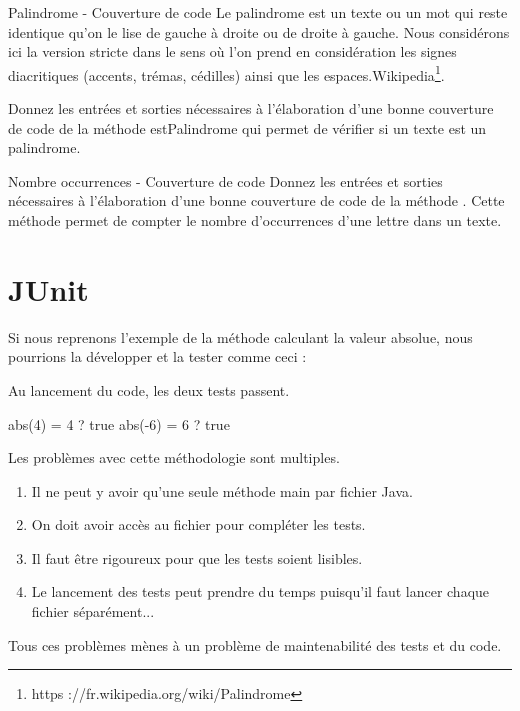 \documentclass[a4paper,11pt]{article}
\begin{document}
	\begin{Exercice}{Palindrome - Couverture de code}
		\og Le palindrome est un texte ou un mot qui reste identique qu’on le lise de gauche à droite ou de droite à gauche. Nous considérons ici la version stricte dans le sens où l’on prend en considération les signes diacritiques (accents, trémas, cédilles) ainsi que les espaces.\fg Wikipedia\footnote{https ://fr.wikipedia.org/wiki/Palindrome}.

		Donnez les entrées et sorties nécessaires à l’élaboration d’une bonne couverture de code de la méthode estPalindrome qui permet de vérifier si un texte est un palindrome.
	\end{Exercice}

	\begin{Exercice}{Nombre occurrences - Couverture de code}
		Donnez les entrées et sorties nécessaires à l’élaboration d’une bonne couverture de code de la méthode . Cette méthode permet de compter le nombre d'occurrences d’une lettre dans un texte.
	\end{Exercice}

\section{JUnit}

	Si nous reprenons l’exemple de la méthode calculant la valeur absolue, nous pourrions la développer et la tester comme ceci :

	Au lancement du code, les deux tests passent.
	\begin{Console}
		abs(4) = 4 ? true
		abs(-6) = 6 ? true
	\end{Console}

	Les problèmes avec cette méthodologie sont multiples.
	\begin{enumerate}
		\item Il ne peut y avoir qu’une seule méthode main par fichier Java.
 		\item On doit avoir accès au fichier pour compléter les tests.
 		\item Il faut être rigoureux pour que les tests soient lisibles.
 		\item Le lancement des tests peut prendre du temps puisqu'il faut lancer chaque fichier séparément...
	\end{enumerate}
	Tous ces problèmes mènes à un problème de maintenabilité des tests et du code.
\end{document}
